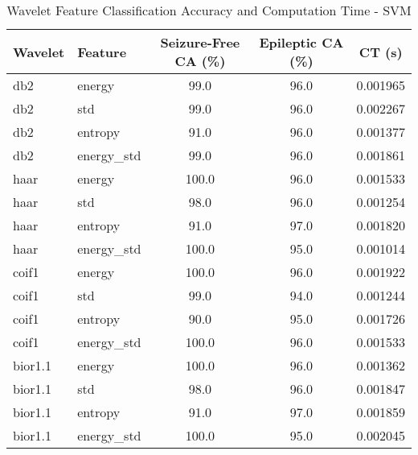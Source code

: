 \begin{table}[!ht]
    \centering
    \caption{Wavelet Feature Classification Accuracy and Computation Time - SVM}
    \begin{tabular}{l l S[table-format=3.1] S[table-format=3.1] S[table-format=1.6]}
        \toprule
        \textbf{Wavelet} & \textbf{Feature} & \textbf{Seizure-Free CA (\%)} & \textbf{Epileptic CA (\%)} & \textbf{CT (s)} \\
        \midrule
        db2       & energy       & 99.0  & 96.0 & 0.001965 \\
        db2       & std          & 99.0  & 96.0 & 0.002267 \\
        db2       & entropy      & 91.0  & 96.0 & 0.001377 \\
        db2       & energy\_std  & 99.0  & 96.0 & 0.001861 \\
        haar      & energy       & 100.0 & 96.0 & 0.001533 \\
        haar      & std          & 98.0  & 96.0 & 0.001254 \\
        haar      & entropy      & 91.0  & 97.0 & 0.001820 \\
        haar      & energy\_std  & 100.0 & 95.0 & 0.001014 \\
        coif1     & energy       & 100.0 &  96.0 &  0.001922 \\
        coif1     & std          & 99.0  & 94.0 & 0.001244 \\
        coif1     & entropy      & 90.0  & 95.0 & 0.001726 \\
        coif1     & energy\_std  &  100.0 &  96.0 &  0.001533 \\
        bior1.1   & energy       & 100.0 & 96.0 & 0.001362 \\
        bior1.1   & std          & 98.0  & 96.0 & 0.001847 \\
        bior1.1   & entropy      & 91.0  & 97.0 & 0.001859 \\
        bior1.1   & energy\_std  & 100.0 & 95.0 & 0.002045 \\
        \bottomrule
    \end{tabular}
\end{table}
